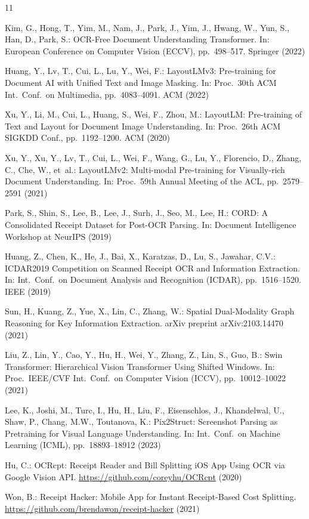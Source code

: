 \documentclass[9pt,twocolumn,twoside]{extarticle}
\begin{document}
{\small
\begin{thebibliography}{11}

Kim, G., Hong, T., Yim, M., Nam, J., Park, J., Yim, J., Hwang, W., Yun, S., Han, D., Park, S.:
{OCR}-Free Document Understanding Transformer.
In: European Conference on Computer Vision (ECCV), pp.~498--517. Springer (2022)

Huang, Y., Lv, T., Cui, L., Lu, Y., Wei, F.:
{LayoutLMv3}: Pre-training for Document {AI} with Unified Text and Image Masking.
In: Proc.\ 30th ACM Int.\ Conf.\ on Multimedia, pp.~4083--4091. ACM (2022)

Xu, Y., Li, M., Cui, L., Huang, S., Wei, F., Zhou, M.:
{LayoutLM}: Pre-training of Text and Layout for Document Image Understanding.
In: Proc.\ 26th ACM SIGKDD Conf., pp.~1192--1200. ACM (2020)

Xu, Y., Xu, Y., Lv, T., Cui, L., Wei, F., Wang, G., Lu, Y., Florencio, D., Zhang, C., Che, W., et~al.:
{LayoutLMv2}: Multi-modal Pre-training for Visually-rich Document Understanding.
In: Proc.\ 59th Annual Meeting of the ACL, pp.~2579--2591 (2021)

Park, S., Shin, S., Lee, B., Lee, J., Surh, J., Seo, M., Lee, H.:
{CORD}: A Consolidated Receipt Dataset for Post-{OCR} Parsing.
In: Document Intelligence Workshop at NeurIPS (2019)

Huang, Z., Chen, K., He, J., Bai, X., Karatzas, D., Lu, S., Jawahar, C.V.:
{ICDAR2019} Competition on Scanned Receipt {OCR} and Information Extraction.
In: Int.\ Conf.\ on Document Analysis and Recognition (ICDAR), pp.~1516--1520. IEEE (2019)

Sun, H., Kuang, Z., Yue, X., Lin, C., Zhang, W.:
Spatial Dual-Modality Graph Reasoning for Key Information Extraction.
arXiv preprint arXiv:2103.14470 (2021)

Liu, Z., Lin, Y., Cao, Y., Hu, H., Wei, Y., Zhang, Z., Lin, S., Guo, B.:
Swin Transformer: Hierarchical Vision Transformer Using Shifted Windows.
In: Proc.\ IEEE/CVF Int.\ Conf.\ on Computer Vision (ICCV), pp.~10012--10022 (2021)

Lee, K., Joshi, M., Turc, I., Hu, H., Liu, F., Eisenschlos, J., Khandelwal, U., Shaw, P., Chang, M.W., Toutanova, K.:
{Pix2Struct}: Screenshot Parsing as Pretraining for Visual Language Understanding.
In: Int.\ Conf.\ on Machine Learning (ICML), pp.~18893--18912 (2023)

Hu, C.:
{OCRcpt}: Receipt Reader and Bill Splitting {iOS} App Using {OCR} via {Google Vision API}.
\url{https://github.com/coreyhu/OCRcpt} (2020)

Won, B.:
Receipt Hacker: Mobile App for Instant Receipt-Based Cost Splitting.
\url{https://github.com/brendawon/receipt-hacker} (2021)

\end{thebibliography}
}
\end{document}
